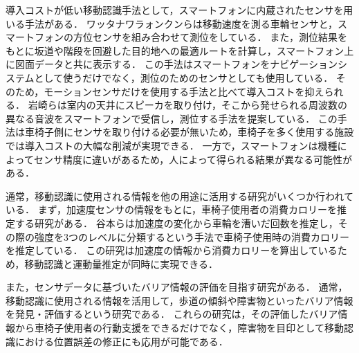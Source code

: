 導入コストが低い移動認識手法として，スマートフォンに内蔵されたセンサを用いる手法がある．
ワッタナワラォンクンらは移動速度を測る車輪センサと，スマートフォンの方位センサを組み合わせて測位をしている\cite{navi}．
また，測位結果をもとに坂道や階段を回避した目的地への最適ルートを計算し，スマートフォン上に図面データと共に表示する．
この手法はスマートフォンをナビゲーションシステムとして使うだけでなく，測位のためのセンサとしても使用している．
そのため，モーションセンサだけを使用する手法と比べて導入コストを抑えられる．
岩崎らは室内の天井にスピーカを取り付け，そこから発せられる周波数の異なる音波をスマートフォンで受信し，測位する手法を提案している\cite{microphone}．
この手法は車椅子側にセンサを取り付ける必要が無いため，車椅子を多く使用する施設では導入コストの大幅な削減が実現できる．
一方で，スマートフォンは機種によってセンサ精度に違いがあるため，人によって得られる結果が異なる可能性がある．

通常，移動認識に使用される情報を他の用途に活用する研究がいくつか行われている．
まず，加速度センサの情報をもとに，車椅子使用者の消費カロリーを推定する研究がある．
谷本らは加速度の変化から車輪を漕いだ回数を推定し，その際の強度を3つのレベルに分類するという手法で車椅子使用時の消費カロリーを推定している\cite{en-calorie}．
この研究は加速度の情報から消費カロリーを算出しているため，移動認識と運動量推定が同時に実現できる．

また，センサデータに基づいたバリア情報の評価を目指す研究がある\cite{OperationModel, RoadEval, on-demand, en-Mahalanobis}．
通常，移動認識に使用される情報を活用して，歩道の傾斜や障害物といったバリア情報を発見・評価するという研究である．
これらの研究は，その評価したバリア情報から車椅子使用者の行動支援をできるだけでなく，障害物を目印として移動認識における位置誤差の修正にも応用が可能である．
